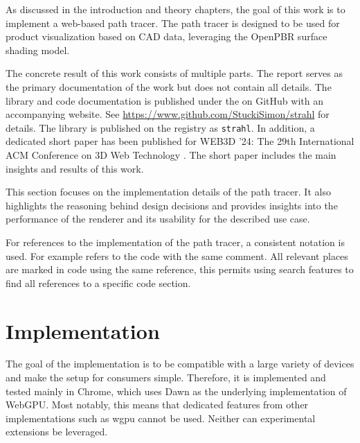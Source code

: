 
As discussed in the introduction and theory chapters, the goal of this work is to implement a web-based path tracer. The path tracer is designed to be used for product visualization based on \gls{CAD} data, leveraging the \gls{OpenPBR} surface shading model.

The concrete result of this work consists of multiple parts. The report serves as the primary documentation of the work but does not contain all details. The library and code documentation is published under the  on GitHub with an accompanying website. See \url{https://www.github.com/StuckiSimon/strahl} for details. The library is published on the  registry as \texttt{strahl}. In addition, a dedicated short paper has been published for WEB3D '24: The 29th International ACM Conference on 3D Web Technology \cite{ownShortPaper}. The short paper includes the main insights and results of this work.

This section focuses on the implementation details of the path tracer. It also highlights the reasoning behind design decisions and provides insights into the performance of the renderer and its usability for the described use case.

For references to the implementation of the path tracer, a consistent notation is used. For example  refers to the code with the same comment. All relevant places are marked in code using the same reference, this permits using search features to find all references to a specific code section.

\section{Implementation}

The goal of the implementation is to be compatible with a large variety of devices and make the setup for consumers simple. Therefore, it is implemented and tested mainly in Chrome, which uses \gls{Dawn} as the underlying implementation of \gls{WebGPU}. Most notably, this means that dedicated features from other implementations such as \gls{wgpu} cannot be used. Neither can experimental extensions be leveraged.

